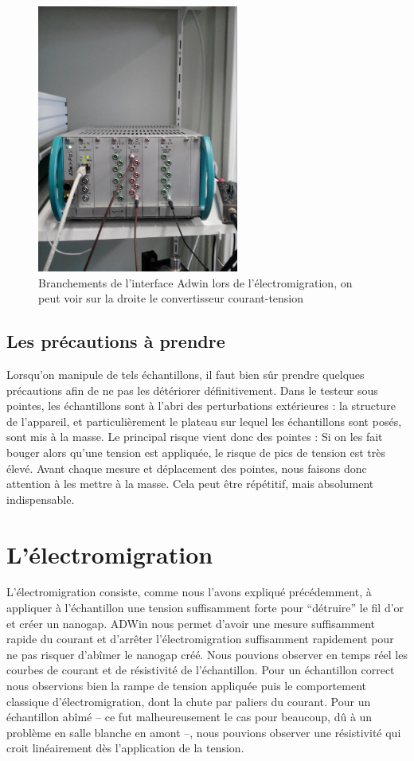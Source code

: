 \begin{figure}[h]
    \begin{center}
        \includegraphics[width=250px]{Photos/Branchements_ADWin.jpg}
        \caption{Branchements de l'interface Adwin lors de l'électromigration, on peut voir sur la droite le convertisseur courant-tension}
        \label{fig:}
    \end{center}
\end{figure}


\subsection{Les précautions à prendre}
Lorsqu'on manipule de tels échantillons, il faut bien sûr prendre quelques précautions afin de ne pas les détériorer définitivement.
Dans le testeur sous pointes, les échantillons sont à l'abri des perturbations extérieures : la structure de l'appareil, et particulièrement le plateau sur lequel les échantillons sont posés, sont mis à la masse.
Le principal risque vient donc des pointes : Si on les fait bouger alors qu'une tension est appliquée, le risque de pics de tension est très élevé. Avant chaque mesure et déplacement des pointes, nous faisons donc attention à les mettre à la masse. Cela peut être répétitif, mais absolument indispensable. 

\section{L'électromigration}
L'électromigration consiste, comme nous l'avons expliqué précédemment, à appliquer à l'échantillon une tension suffisamment forte pour “détruire” le fil d'or et créer un nanogap.
ADWin nous permet d'avoir une mesure suffisamment rapide du courant et d'arrêter l'électromigration suffisamment rapidement pour ne pas risquer d'abîmer le nanogap créé.
Nous pouvions observer en temps réel les courbes de courant et de résistivité de l'échantillon. Pour un échantillon correct nous observions bien la rampe de tension appliquée puis le comportement classique d'électromigration, dont la chute par paliers du courant.
Pour un échantillon abîmé -- ce fut malheureusement le cas pour beaucoup, dû à un problème en salle blanche en amont --, nous pouvions observer une résistivité qui croit linéairement dès l'application de la tension.
